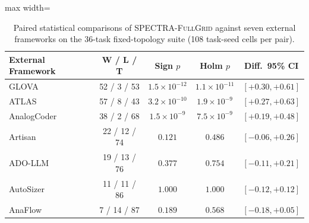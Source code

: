\begin{table}[ht]
\centering
\caption{Paired statistical comparisons of \textsc{SPECTRA-FullGrid} against seven external frameworks on the 36-task fixed-topology suite (108 task-seed cells per pair).}
\label{tab:supp_paired}
\scriptsize
\setlength{\tabcolsep}{2.2pt}
\begin{adjustbox}{max width=\columnwidth}
\begin{tabular}{@{}lcccc@{}}
\toprule
External Framework & W / L / T & Sign $p$ & Holm $p$ & Diff.\ 95\% CI \\
\midrule
GLOVA~\cite{kim2025glova} & 52 / 3 / 53 & $1.5\!\times\!10^{-12}$ & $1.1\!\times\!10^{-11}$ & $[+0.30, +0.61]$ \\
ATLAS~\cite{oh2026atlas} & 57 / 8 / 43 & $3.2\!\times\!10^{-10}$ & $1.9\!\times\!10^{-9}$ & $[+0.27, +0.63]$ \\
AnalogCoder~\cite{lai2025analogcoder} & 38 / 2 / 68 & $1.5\!\times\!10^{-9}$ & $7.5\!\times\!10^{-9}$ & $[+0.19, +0.48]$ \\
Artisan~\cite{chen2024artisan} & 22 / 12 / 74 & $0.121$ & $0.486$ & $[-0.06, +0.26]$ \\
ADO-LLM~\cite{yin2024adollm} & 19 / 13 / 76 & $0.377$ & $0.754$ & $[-0.11, +0.21]$ \\
AutoSizer~\cite{yu2026autosizer} & 11 / 11 / 86 & $1.000$ & $1.000$ & $[-0.12, +0.12]$ \\
AnaFlow~\cite{ahmadzadeh2025anaflow} & 7 / 14 / 87 & $0.189$ & $0.568$ & $[-0.18, +0.05]$ \\
\bottomrule
\end{tabular}
\end{adjustbox}
\end{table}

